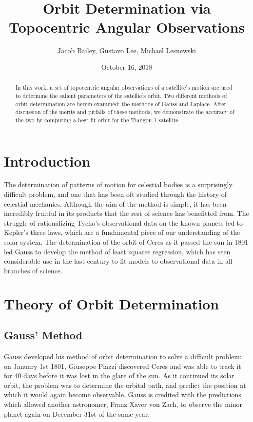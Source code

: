 \documentclass[11pt,twoside,letterpaper]{article}
\begin{document}
\title{Orbit Determination via Topocentric Angular Observations}
\author{Jacob Bailey, Gustavo Lee, Michael Lesnewski}
\date{October 16, 2018}
\maketitle

  \begin{abstract}
    In this work, a set of topocentric angular observations of a
    satellite's motion are used to determine the salient parameters of
    the satellie's orbit. Two different methods of orbit determination
    are herein examined: the methods of Gauss and Laplace. After
    discussion of the merits and pitfalls of these methods, we
    demonstrate the accuracy of the two by computing a best-fit orbit
    for the Tiangon-1 satellite.
  \end{abstract}

  \section {Introduction}
  \paragraph{}
  The determination of patterns of motion for celestial bodies is a
  surprisingly difficult problem, and one that has been oft studied
  through the history of celestial mechanics. Although the aim of the
  method is simple, it has been incredibly fruitful in its products
  that the rest of science has benefitted from. The struggle of
  rationalizing Tycho's observational data on the known planets led to
  Kepler's three laws, which are a fundamental piece of our
  understanding of the solar system. The determination of the orbit of
  Ceres as it passed the sun in 1801 led Gauss to develop the method
  of least squares regression, which has seen considerable use in the
  last century to fit models to observational data in all branches of
  science.

  
  \section{Theory of Orbit Determination}
  
  \subsection {Gauss' Method}
    
  \paragraph{}
  Gauss developed his method of orbit determination to solve a
  difficult problem: on January 1st 1801, Giuseppe Piazzi discovered
  Ceres and was able to track it for 40 days before it was lost in the
  glare of the sun. As it continued its solar orbit, the problem was
  to determine the orbital path, and predict the position at which it
  would again become observable. Gauss is credited with the
  predictions which allowed another astronomer, Franz Xaver von Zach,
  to observe the minor planet again on December 31st of the same year.
\end{document}
